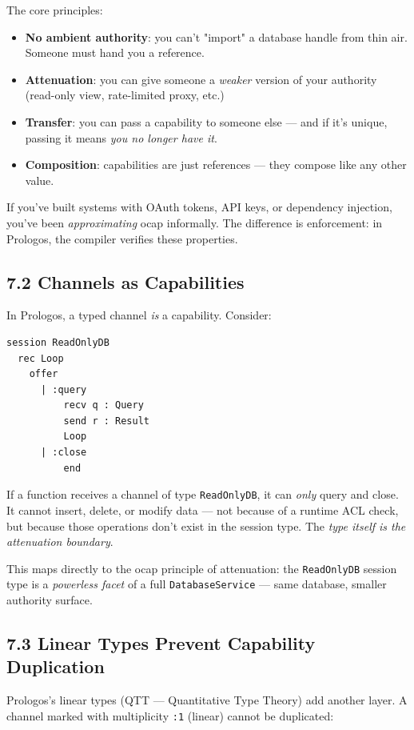 \documentclass[11pt]{article}
\begin{document}
The core principles:
\begin{itemize}
\item \textbf{No ambient authority}: you can't "import" a database handle from thin
air. Someone must hand you a reference.
\item \textbf{Attenuation}: you can give someone a \emph{weaker} version of your authority
(read-only view, rate-limited proxy, etc.)
\item \textbf{Transfer}: you can pass a capability to someone else — and if it's
unique, passing it means \emph{you no longer have it}.
\item \textbf{Composition}: capabilities are just references — they compose like any
other value.
\end{itemize}

If you've built systems with OAuth tokens, API keys, or dependency
injection, you've been \emph{approximating} ocap informally. The difference is
enforcement: in Prologos, the compiler verifies these properties.
\subsection{7.2 Channels as Capabilities}
\label{sec:org2cd069c}

In Prologos, a typed channel \emph{is} a capability. Consider:

\begin{verbatim}
session ReadOnlyDB
  rec Loop
    offer
      | :query
          recv q : Query
          send r : Result
          Loop
      | :close
          end
\end{verbatim}

If a function receives a channel of type \texttt{ReadOnlyDB}, it can \emph{only}
query and close. It cannot insert, delete, or modify data ---
not because of a runtime ACL check, but because those operations
don't exist in the session type. The \emph{type itself is the attenuation
boundary}.

This maps directly to the ocap principle of attenuation: the
\texttt{ReadOnlyDB} session type is a \emph{powerless facet} of a full
\texttt{DatabaseService} --- same database, smaller authority surface.
\subsection{7.3 Linear Types Prevent Capability Duplication}
\label{sec:orgb22a52e}

Prologos's linear types (QTT --- Quantitative Type Theory) add another
layer. A channel marked with multiplicity \texttt{:1} (linear) cannot be
duplicated:
\end{document}
